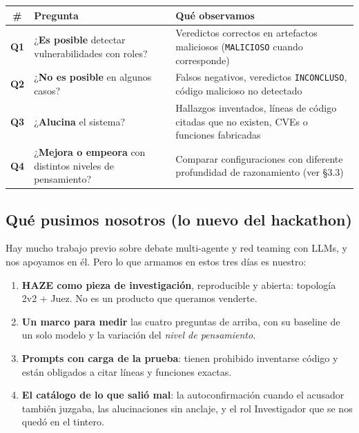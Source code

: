 \documentclass[10pt]{article}
\begin{document}
\begin{table}[h]
\centering
\small
\begin{tabularx}{\textwidth}{@{}c L{5cm} X@{}}
\toprule
\# & Pregunta & Qué observamos \\
\midrule
\textbf{Q1} & ¿\textbf{Es posible} detectar vulnerabilidades con roles? & Veredictos
correctos en artefactos maliciosos (\texttt{MALICIOSO} cuando corresponde) \\
\textbf{Q2} & ¿\textbf{No es posible} en algunos casos? & Falsos negativos, veredictos
\texttt{INCONCLUSO}, código malicioso no detectado \\
\textbf{Q3} & ¿\textbf{Alucina} el sistema? & Hallazgos inventados, líneas de código
citadas que no existen, CVEs o funciones fabricadas \\
\textbf{Q4} & ¿\textbf{Mejora o empeora} con distintos niveles de pensamiento? &
Comparar configuraciones con diferente profundidad de razonamiento (ver §3.3) \\
\bottomrule
\end{tabularx}
\end{table}

\subsection{Qué pusimos nosotros (lo nuevo del hackathon)}

Hay mucho trabajo previo sobre debate multi-agente y red teaming con LLMs, y nos
apoyamos en él. Pero lo que armamos en estos tres días es nuestro:

\begin{enumerate}[leftmargin=*]
  \item \textbf{HAZE como pieza de investigación}, reproducible y abierta: topología
  2v2 + Juez. No es un producto que queramos venderte.
  \item \textbf{Un marco para medir} las cuatro preguntas de arriba, con su baseline de
  un solo modelo y la variación del \textit{nivel de pensamiento}.
  \item \textbf{Prompts con carga de la prueba}: tienen prohibido inventarse código y
  están obligados a citar líneas y funciones exactas.
  \item \textbf{El catálogo de lo que salió mal}: la autoconfirmación cuando el acusador
  también juzgaba, las alucinaciones sin anclaje, y el rol Investigador que se nos quedó
  en el tintero.
\end{enumerate}

\end{document}
